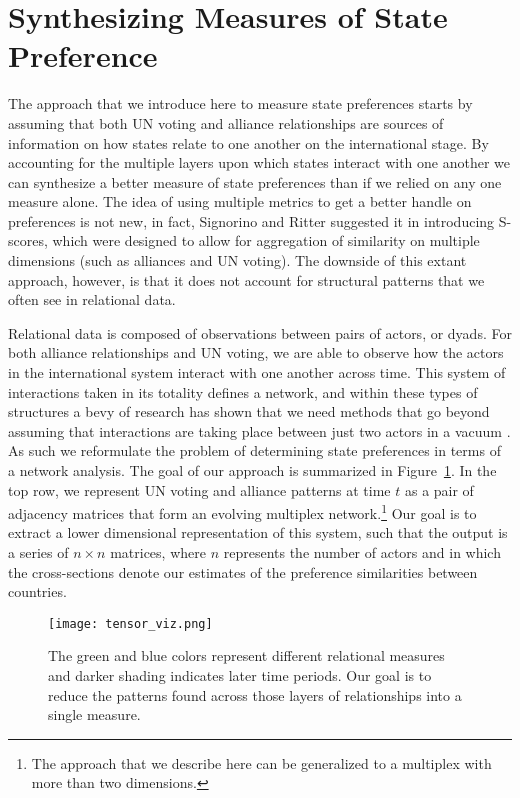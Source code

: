 \section*{Synthesizing Measures of State Preference}

The approach that we introduce here to measure state preferences starts by assuming that both UN voting and alliance relationships are sources of information on how states relate to one another on the international stage. By accounting for the multiple layers upon which states interact with one another we can synthesize a better measure of state preferences than if we relied on any one measure alone. The idea of using multiple metrics to get a better handle on preferences is not new, in fact, Signorino and Ritter suggested it in introducing S-scores, which were designed to allow for aggregation of similarity on multiple dimensions (such as alliances and UN voting). The downside of this extant approach, however, is that it does not account for structural patterns that we often see in relational data.

Relational data is composed of observations between pairs of actors, or dyads. For both alliance relationships and UN voting, we are able to observe how the actors in the international system interact with one another across time. This system of interactions taken in its totality defines a network, and within these types of structures a bevy of research has shown that we need methods that go beyond assuming that interactions are taking place between just two actors in a vacuum \citep{wasserman:faust:1994,snijders:nowicki:1997,minhas:etal:2019}. As such we reformulate the problem of determining state preferences in terms of a network analysis. The goal of our approach is summarized in Figure~\ref{fig:tensViz}. In the top row, we represent UN voting and alliance patterns at time $t$ as a pair of adjacency matrices that form an evolving multiplex network.\footnote{The approach that we describe here can be generalized to a multiplex with more than two dimensions.} Our goal is to extract a lower dimensional representation of this system, such that the output is a series of $n \times n$ matrices, where $n$ represents the number of actors and in which the cross-sections denote our estimates of the preference similarities between countries.

\begin{figure}[ht]
	\centering
	\texttt{[image: tensor\_viz.png]}
	\caption{The green and blue colors represent different relational measures and darker shading indicates later time periods. Our goal is to reduce the patterns found across those layers of relationships into a single measure.}
	\label{fig:tensViz}
\end{figure}

